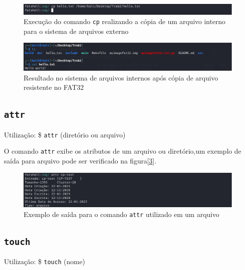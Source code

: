 \documentclass[
    12pt,				%
    oneside,   	        %
    a4paper,			%
    english,			%
    french,				%
    spanish,			%
    brazil,				%
    ]{pacotes/abntex2}
\begin{document}
\begin{figure}[H]
    \centering
    \includegraphics[width=450pt]{figuras/resultados/6-cp-interno-externo.PNG}
    \caption{Execução do comando \texttt{cp} realizando a cópia de um arquivo interno para o sistema de arquivos externo}
    \label{fig:cp-interno-externo-1}
\end{figure}

\begin{figure}[H]
    \centering
    \includegraphics[width=450pt]{figuras/resultados/7-cp-arquivo-externo-resultado.PNG}
    \caption{Resultado no sistema de arquivos internos após cópia de arquivo resistente no FAT32}
    \label{fig:cp-interno-externo-2}
\end{figure}


\subsection{\texttt{attr}}
\label{subsec:attr}
Utilização: \$ \texttt{attr} (diretório ou arquivo)

O comando \texttt{attr} exibe os atributos de um arquivo ou diretório,um exemplo de saída para arquivo pode ser verificado na figura[\ref{fig:attr}].

\begin{figure}[H]
    \centering
    \includegraphics[width=450pt]{figuras/resultados/4-attr.PNG}
    \caption{Exemplo de saída para o comando \texttt{attr} utilizado em um arquivo}
    \label{fig:attr}
\end{figure}


\subsection{\texttt{touch}}
\label{subsec:touch}
Utilização: \$ \texttt{touch} (nome)
\end{document}
